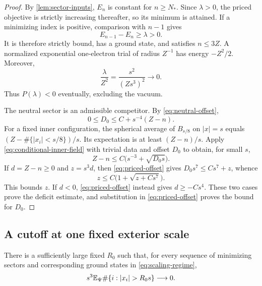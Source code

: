 \begin{proof}
By \cref{lem:sector-inputs}, $E_n$ is constant for $n\ge N_*$.  Since
$\lambda>0$, the priced objective is strictly increasing thereafter, so
its minimum is attained.  If a minimizing index is positive, comparison
with $n-1$ gives
\[
 E_{n-1}-E_n\ge\lambda>0.
\]
It is therefore strictly bound, has a ground state, and satisfies $n\le3Z$.
A normalized exponential one-electron trial of radius $Z^{-1}$ has energy
$-Z^2/2$.  Moreover,
\[
 \frac\lambda{Z^2}=\frac{s^2}{(Zs^3)^2}\longrightarrow0.
\]
Thus $P(\lambda)<0$ eventually, excluding the vacuum.

The neutral sector is an admissible competitor.  By
\cref{eq:neutral-offset},
\begin{equation}\label{eq:priced-offset}
 0\le D_0\le C+s^{-4}(Z-n).
\end{equation}
For a fixed inner configuration, the spherical average of $B_{s/8}$ on
$|x|=s$ equals $(Z-\#\{|x_i|<s/8\})/s$.  Its expectation is at least
$(Z-n)/s$.  Apply \cref{eq:conditional-inner-field} with trivial data and
offset $D_0$ to obtain, for small $s$,
\[
 Z-n\le C\bigl(s^{-3}+\sqrt{D_0s}\bigr).
\]
If $d=Z-n\ge0$ and $z=s^3d$, then \cref{eq:priced-offset} gives
$D_0s^7\le Cs^7+z$, whence
\[
 z\le C\bigl(1+\sqrt{z+Cs^7}\bigr).
\]
This bounds $z$.  If $d<0$, \cref{eq:priced-offset} instead gives
$d\ge-Cs^4$.  These two cases prove the deficit estimate, and substitution
in \cref{eq:priced-offset} proves the bound for $D_0$.
\end{proof}

\subsection{A cutoff at one fixed exterior scale}

\begin{lemma}\label{lem:exterior-cutoff}
There is a sufficiently large fixed $R_0$ such that, for every sequence of
minimizing sectors and corresponding ground states in
\cref{eq:scaling-regime},
\begin{equation}\label{eq:exterior-cutoff}
 s^3\E_\Psi\#\{i:|x_i|>R_0s\}\longrightarrow0.
\end{equation}
\end{lemma}

